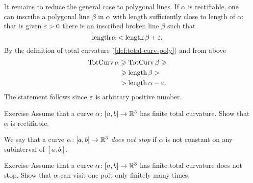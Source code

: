 It remains to reduce the general case to polygonal lines.
If $\alpha$ is rectifiable, one can inscribe a polygonal line $\beta$ in $\alpha$ with length sufficiently close to length of $\alpha$; that is given $\varepsilon>0$ there is an inscribed broken line $\beta$ such that 
\[\mathop{\rm length}\nolimits \alpha<\mathop{\rm length}\nolimits \beta+\varepsilon.\]
By the definition of total curvature (\ref{def:total-curv-poly}) and from above
\begin{align*}
\mathop{\rm TotCurv}\nolimits\alpha&\geqslant\mathop{\rm TotCurv}\nolimits\beta\geqslant
\\
&\geqslant \mathop{\rm length}\nolimits\beta>
\\
&>\mathop{\rm length}\nolimits\alpha-\varepsilon.
\end{align*}
The statement follows since $\varepsilon$ is arbitrary positive number. 
\qeds

\begin{thm}{Exercise} 
Assume that a curve $\alpha\colon[a,b]\to\mathbb{R}^3$ has finite total curvature.
 Show that $\alpha$ is rectifiable.
\end{thm}

We say that a curve $\alpha\colon[a,b]\to\mathbb{R}^3$ \emph{does not stop} if $\alpha$ is not constant on any subinterval of $[a,b]$. 

\begin{thm}{Exercise} 
Assume that a curve $\alpha\colon[a,b]\to\mathbb{R}^3$ has finite total curvature does not stop.
Show that $\alpha$ can visit one poit only finitely many times.
\end{thm}
